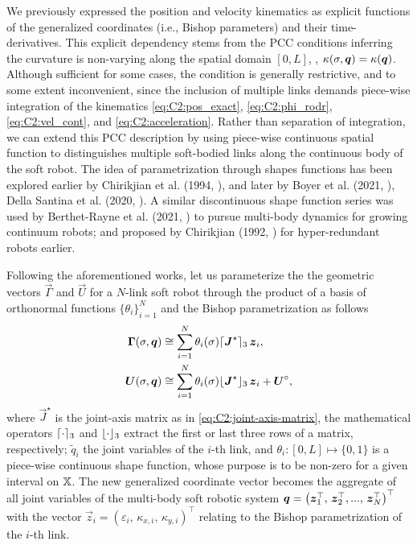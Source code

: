 \noindent We previously expressed the position and velocity kinematics as explicit functions of the generalized coordinates (i.e., Bishop parameters) and their time-derivatives. This explicit dependency stems from the PCC conditions inferring the curvature is non-varying along the spatial domain $[0,L]$, \ie, $\kappa(\sigma,{\boldsymbol{q}}) = \kappa({\boldsymbol{q}})$. Although sufficient for some cases, the condition is generally restrictive, and to some extent inconvenient, since the inclusion of multiple links demands piece-wise integration of the kinematics \eqref{eq:C2:pos_exact}, \eqref{eq:C2:phi_rodr}, \eqref{eq:C2:vel_cont}, and \eqref{eq:C2:acceleration}. Rather than separation of integration, we can extend this PCC description by using piece-wise continuous spatial function to distinguishes multiple soft-bodied links along the continuous body of the soft robot. The idea of parametrization through shapes functions has been explored earlier by Chirikjian et al. (1994,
\cite{Chirikjian1994,Chirikjian1992}), and later by Boyer et al. (2021, \cite{Boyer2021}), Della Santina et al. (2020, \cite{DellaSantina2020}). A similar discontinuous shape function series was used by Berthet-Rayne et al. (2021, \cite{Berthet2021}) to pursue multi-body dynamics for growing continuum robots; and proposed by Chirikjian (1992,
\cite{Chirikjian1992}) for hyper-redundant robots earlier.

Following the aforementioned works, let us parameterize the the geometric vectors $\vec{\Gamma}$ and $\vec{U}$ for a $N$-link soft robot through the product of a basis of orthonormal functions $\!\{\theta_i\}_{i=1}^{N}$ and the Bishop parametrization as follows
%
\begin{align} \boldsymbol{\Gamma}(\sigma,{\boldsymbol{q}}) & \cong \sum^N_{i=1} \theta_i(\sigma) \lceil{\boldsymbol{J}}^\star\rceil_3
\,\boldsymbol{z}_i, \label{eq:C2:theta_extent} \\ \boldsymbol{U}(\sigma,{\boldsymbol{q}}) & \cong \sum^N_{i=1} \theta_i(\sigma)
\lfloor{\boldsymbol{J}}^\star\rfloor_3\,\boldsymbol{z}_i + {\boldsymbol{U}}^\circ, \label{eq:C2:h_extent} \end{align}
%
where $\vec{J}^\star$ is the joint-axis matrix as in \eqref{eq:C2:joint-axis-matrix}, the mathematical operators $\lceil\cdot\rceil_3$ and $\lfloor\cdot\rfloor_3$  extract the first or last three rows of a matrix, respectively;  $\tilde{q}_i$ the joint variables of the $i$-th link, and $\theta_i: [0,L] \mapsto \{0,1\}$ is a piece-wise continuous shape function, whose purpose is to be non-zero for a given interval on
$\mathbb{X}$.
The new generalized coordinate vector becomes the aggregate of all joint variables of the multi-body soft robotic system ${\boldsymbol{q}} =  \left(\boldsymbol{z}_1^\top,\,\boldsymbol{z}_2^\top,...,\,\boldsymbol{z}_N^\top \right)^\top$ with the vector $\vec{z}_i = (\varepsilon_{i},\, \kappa_{x,i},\,\kappa_{y,i})^\top$ relating to the Bishop parametrization of the $i$-th link.

